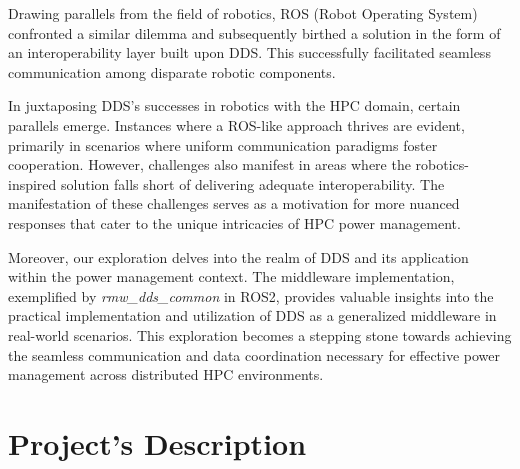 Drawing parallels from the field of robotics, ROS (Robot Operating System) confronted a similar dilemma and subsequently birthed a solution in the form of an interoperability layer built upon DDS. This successfully facilitated seamless communication among disparate robotic components.

In juxtaposing DDS's successes in robotics with the HPC domain, certain parallels emerge. Instances where a ROS-like approach thrives are evident, primarily in scenarios where uniform communication paradigms foster cooperation. However, challenges also manifest in areas where the robotics-inspired solution falls short of delivering adequate interoperability. The manifestation of these challenges serves as a motivation for more nuanced responses that cater to the unique intricacies of HPC power management.

Moreover, our exploration delves into the realm of DDS and its application within the power management context. The middleware implementation, exemplified by \emph{rmw\_dds\_common} in ROS2, provides valuable insights into the practical implementation and utilization of DDS as a generalized middleware in real-world scenarios. This exploration becomes a stepping stone towards achieving the seamless communication and data coordination necessary for effective power management across distributed HPC environments.



\section{Project's Description} \label{SEC:pd}


